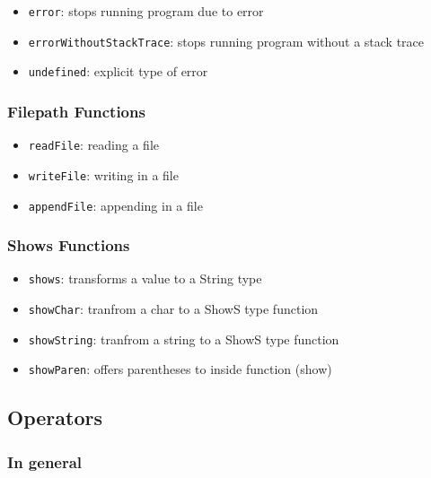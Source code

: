 \documentclass[a4paper, titlepage, twoside]{article}
\begin{document}
\begin{itemize}
\item \texttt{error}: stops running program due to error

\item \texttt{errorWithoutStackTrace}: stops running program without a stack trace

\item \texttt{undefined}: explicit type of error
\end{itemize}

\subsubsection{Filepath Functions}
\label{sec:orgb9830bb}

\begin{itemize}
\item \texttt{readFile}: reading a file

\item \texttt{writeFile}: writing in a file

\item \texttt{appendFile}: appending in a file
\end{itemize}

\subsubsection{Shows Functions}
\label{sec:orgf2aa4df}

\begin{itemize}
\item \texttt{shows}: transforms a value to a String type

\item \texttt{showChar}: tranfrom a char to a ShowS type function

\item \texttt{showString}: tranfrom a string to a ShowS type function

\item \texttt{showParen}: offers parentheses to inside function (show)
\end{itemize}

\subsection{Operators}
\label{sec:org3516bfe}

\subsubsection{In general}
\label{sec:orga669dd7}
\end{document}
